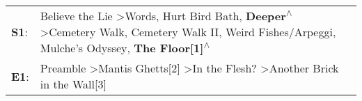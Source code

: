 \begin{supertabular}{p{0.03\textwidth}p{0.92\textwidth}}
 \textbf{S1}:  &  Believe the Lie\textsuperscript{} \textgreater \enspace Words\textsuperscript{}, \enspace Hurt Bird Bath\textsuperscript{}, \enspace \textbf{Deeper\textsuperscript{$\wedge$}} \textgreater \enspace Cemetery Walk\textsuperscript{}, \enspace Cemetery Walk II\textsuperscript{}, \enspace Weird Fishes/Arpeggi\textsuperscript{}, \enspace Mulche's Odyssey\textsuperscript{}, \enspace \textbf{The Floor[1]\textsuperscript{$\wedge$}}  \enspace  \\
 \textbf{E1}:  &                                                                                                                                                                                                                             Preamble\textsuperscript{} \textgreater \enspace Mantis Ghetts[2]\textsuperscript{} \textgreater \enspace In the Flesh?\textsuperscript{} \textgreater \enspace Another Brick in the Wall[3]\textsuperscript{}  \enspace  \\
\end{supertabular}
